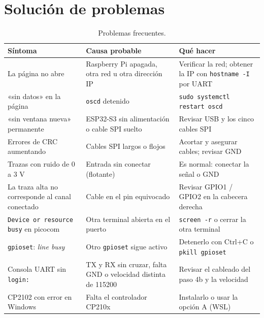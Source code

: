 \documentclass[12pt,a4paper]{article}
\begin{document}
\section{Solución de problemas}

\begin{table}[H]
\centering
\small
\begin{tabular}{@{}p{4.6cm} p{4.6cm} p{5.4cm}@{}}
\toprule
\textbf{Síntoma} & \textbf{Causa probable} & \textbf{Qué hacer} \\
\midrule
La página no abre & Raspberry Pi apagada, otra red u otra dirección IP & Verificar la red; obtener la IP con \texttt{hostname -I} por UART \\
«sin datos» en la página & \texttt{oscd} detenido & \texttt{sudo systemctl restart oscd} \\
«sin ventana nueva» permanente & ESP32-S3 sin alimentación o cable SPI suelto & Revisar USB y los cinco cables SPI \\
Errores de CRC aumentando & Cables SPI largos o flojos & Acortar y asegurar cables; revisar GND \\
Trazas con ruido de 0 a 3 V & Entrada sin conectar (flotante) & Es normal: conectar la señal o GND \\
La traza alta no corresponde al canal conectado & Cable en el pin equivocado & Revisar GPIO1 / GPIO2 en la cabecera derecha \\
\texttt{Device or resource busy} en picocom & Otra terminal abierta en el puerto & \texttt{screen -r} o cerrar la otra terminal \\
\texttt{gpioset}: \emph{line busy} & Otro \texttt{gpioset} sigue activo & Detenerlo con Ctrl+C o \texttt{pkill gpioset} \\
Consola UART sin \texttt{login:} & TX y RX sin cruzar, falta GND o velocidad distinta de 115200 & Revisar el cableado del paso 4b y la velocidad \\
CP2102 con error en Windows & Falta el controlador CP210x & Instalarlo o usar la opción A (WSL) \\
\bottomrule
\end{tabular}
\caption{Problemas frecuentes.}
\end{table}
\end{document}
